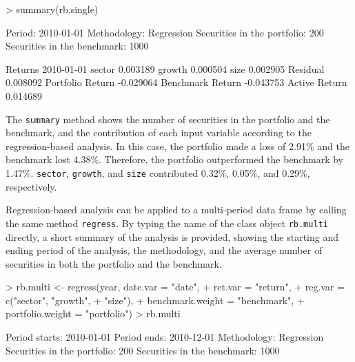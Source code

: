 \begin{Schunk}
\begin{Sinput}
> summary(rb.single)
\end{Sinput}
\begin{Soutput}
Period:                              2010-01-01
Methodology:                         Regression
Securities in the portfolio:         200
Securities in the benchmark:         1000

Returns 
                 2010-01-01
sector             0.003189
growth             0.000504
size               0.002905
Residual           0.008092
Portfolio Return  -0.029064
Benchmark Return  -0.043753
Active Return      0.014689
\end{Soutput}
\end{Schunk}

The \texttt{summary} method shows the number of securities in the
portfolio and the benchmark, and the contribution of each input
variable according to the regression-based analysis. In this case, the
portfolio made a loss of 2.91\% and the benchmark lost
4.38\%. Therefore, the portfolio outperformed the benchmark by
1.47\%. \texttt{sector}, \texttt{growth}, and \texttt{size}
contributed 0.32\%, 0.05\%, and 0.29\%, respectively.

Regression-based analysis can be applied to a multi-period data frame
by calling the same method \texttt{regress}. By typing the name of the
class object \texttt{rb.multi} directly, a short summary of the
analysis is provided, showing the starting and ending period of the
analysis, the methodology, and the average number of securities in
both the portfolio and the benchmark.


\begin{Schunk}
\begin{Sinput}
> rb.multi <- regress(year, date.var = "date",
+                 ret.var = "return",
+                 reg.var = c("sector", "growth", 
+                   "size"),
+                 benchmark.weight = "benchmark",
+                 portfolio.weight = "portfolio")
> rb.multi
\end{Sinput}
\begin{Soutput}
Period starts:                       2010-01-01
Period ends:                         2010-12-01
Methodology:                         Regression
Securities in the portfolio:         200
Securities in the benchmark:         1000
\end{Soutput}
\end{Schunk}

